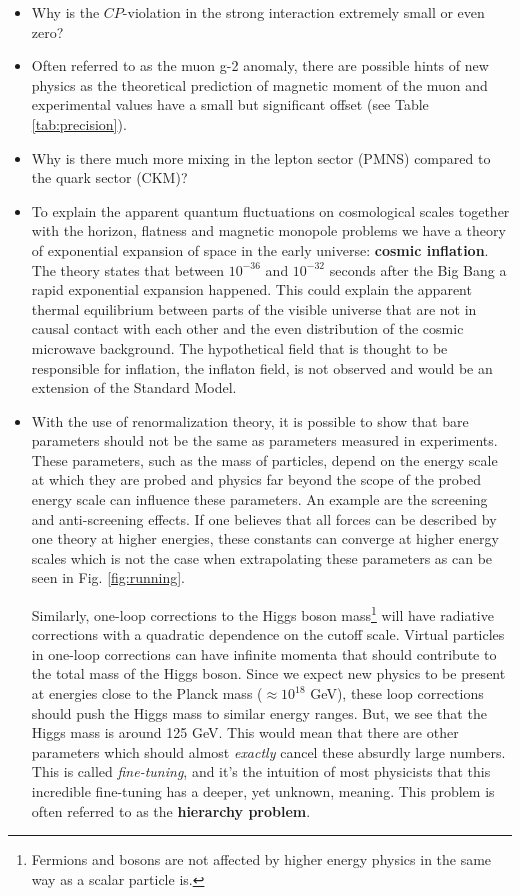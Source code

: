 \begin{itemize}
\item Why is the $CP$-violation in the strong interaction extremely small or even zero?
\item Often referred to as the muon g-2 anomaly, there are possible hints of new physics as the theoretical prediction of magnetic moment of the muon and experimental values have a small but significant offset (see Table \ref{tab:precision}).
\item Why is there much more mixing in the lepton sector (PMNS) compared to the quark sector (CKM)? 
\item To explain the apparent quantum fluctuations on cosmological scales together with the horizon, flatness and magnetic monopole \cite{McCoy:2015bra} problems we have a theory of exponential expansion of space in the early universe: \textbf{cosmic inflation}. The theory states that between $10^{-36}$ and $10^{-32}$ seconds after the Big Bang a rapid exponential expansion happened. This could explain the apparent thermal equilibrium between parts of the visible universe that are not in causal contact with each other and the even distribution of the cosmic microwave background. The hypothetical field that is thought to be responsible for inflation, the inflaton field, is not observed and would be an extension of the Standard Model.
\item With the use of renormalization theory, it is possible to show that bare parameters should not be the same as parameters measured in experiments. These parameters, such as the mass of particles, depend on the energy scale at which they are probed and physics far beyond the scope of the probed energy scale can influence these parameters. An example are the screening and anti-screening effects. If one believes that all forces can be described by one theory at higher energies, these constants can converge at higher energy scales which is not the case when extrapolating these parameters as can be seen in Fig. \ref{fig:running}.

Similarly, one-loop corrections to the Higgs boson mass\footnote{Fermions and bosons are not affected by higher energy physics in the same way as a scalar particle is.} will have radiative corrections with a quadratic dependence on the cutoff scale. Virtual particles in one-loop corrections can have infinite momenta that should contribute to the total mass of the Higgs boson. Since we expect new physics to be present at energies close to the Planck mass ($\approx 10^{18}$ GeV), these loop corrections should push the Higgs mass to similar energy ranges. But, we see that the Higgs mass is around 125 GeV. This would mean that there are other parameters which should almost \textit{exactly} cancel these absurdly large numbers. This is called \textit{fine-tuning}, and it's the intuition of most physicists that this incredible fine-tuning has a deeper, yet unknown, meaning. This problem is often referred to as the \textbf{hierarchy problem}.
\end{itemize}




